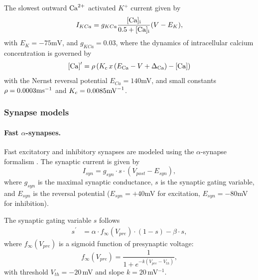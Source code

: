 The slowest outward ${\rm Ca}^{2+}$ activated $K^+$ current given by
\begin{equation}
I_{KCa} =g_{KCa}\frac{[\rm Ca]_i}{0.5+[\rm Ca]_i}(V-E_{K}),
\end{equation}
with $E_{K}=-75\mbox{mV}$, and $g_{KCa}=0.03$, where the dynamics of intracellular calcium concentration is governed by
\begin{equation}
{[\rm Ca]}^\prime  =  \rho \left ( K_{c}\, x\, (E_{\rm Ca}-V + \Delta_{\rm Ca})-[\rm Ca] \right  )
\end{equation}
with the Nernst reversal potential $E_{Ca}=140$mV, and small constants $\rho= 0.0003{\rm ms}^{-1}$ and $K_c=0.0085{\rm mV}^{-1}$.


\subsubsection*{Synapse models}

\paragraph{Fast $\alpha$-synapses.}
Fast excitatory and inhibitory synapses are modeled using the $\alpha$-synapse formalism \cite{destexhe1994synthesis, destexhe1998kinetic, Rall67}.
The synaptic current is given by
\begin{equation}
I_{syn} = g_{syn} \cdot s \cdot (V_{post} - E_{syn}),
\end{equation}
where $g_{syn}$ is the maximal synaptic conductance, $s$ is the synaptic gating variable, and $E_{syn}$ is the reversal potential ($E_{syn} = +40$mV for excitation, $E_{syn} = -80$mV for inhibition).

The synaptic gating variable $s$ follows
\begin{align}
{s}^\prime &= \alpha \cdot f_{\infty}(V_{pre}) \cdot (1 - s) - \beta \cdot s,
\end{align}
where $f_{\infty}(V_{pre})$ is a sigmoid function of presynaptic voltage:
\begin{equation}
f_{\infty}(V_{pre}) = \frac{1}{1 + e^{-k(V_{pre} - V_{th})}},
\end{equation}
with threshold $V_{th} = -20$\,mV and slope $k = 20$\,mV$^{-1}$.

